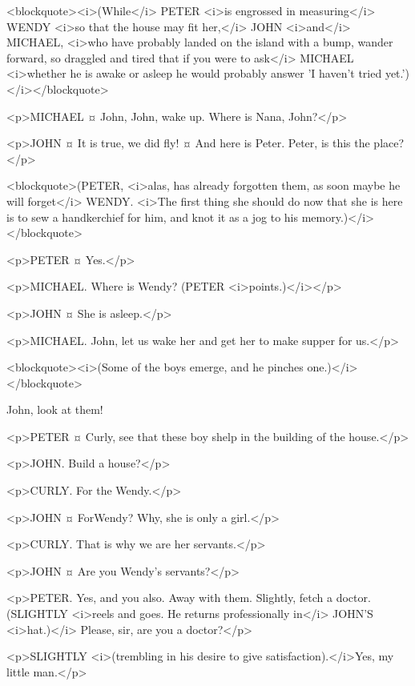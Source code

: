 <blockquote><i>(While</i> PETER <i>is engrossed in measuring</i> WENDY <i>so that the house may fit her,</i> JOHN <i>and</i> MICHAEL, <i>who have probably landed on the island with a bump, wander forward, so draggled and tired that if you were to ask</i> MICHAEL <i>whether he is awake or asleep he would probably answer 'I haven't tried yet.')</i></blockquote>

<p>MICHAEL ¤
John, John, wake up. Where is Nana, John?</p>

<p>JOHN ¤
It is true, we did fly!
¤
And here is Peter. Peter, is this the place?</p>

<blockquote>(PETER, <i>alas, has already forgotten them, as soon maybe he will forget</i> WENDY. <i>The first thing she should do now that she is here is to sew a handkerchief for him, and knot it as a jog to his memory.)</i></blockquote>

<p>PETER ¤
Yes.</p>

<p>MICHAEL. Where is Wendy? (PETER <i>points.)</i></p>

<p>JOHN ¤
She is asleep.</p>

<p>MICHAEL. John, let us wake her and get her to make supper for us.</p>

<blockquote><i>(Some of the boys emerge, and he pinches one.)</i></blockquote>

John, look at them! 

<p>PETER ¤
Curly, see that these boy shelp in the building of the house.</p>

<p>JOHN. Build a house?</p>

<p>CURLY. For the Wendy.</p>

<p>JOHN ¤
ForWendy? Why, she is only a girl.</p>

<p>CURLY. That is why we are her servants.</p>

<p>JOHN ¤
Are you Wendy's servants?</p>

<p>PETER. Yes, and you also. Away with them.
Slightly, fetch a doctor. (SLIGHTLY <i>reels and goes. He returns professionally in</i> JOHN'S <i>hat.)</i> Please, sir, are you a doctor?</p>

<p>SLIGHTLY <i>(trembling in his desire to give satisfaction).</i>Yes, my little man.</p>

